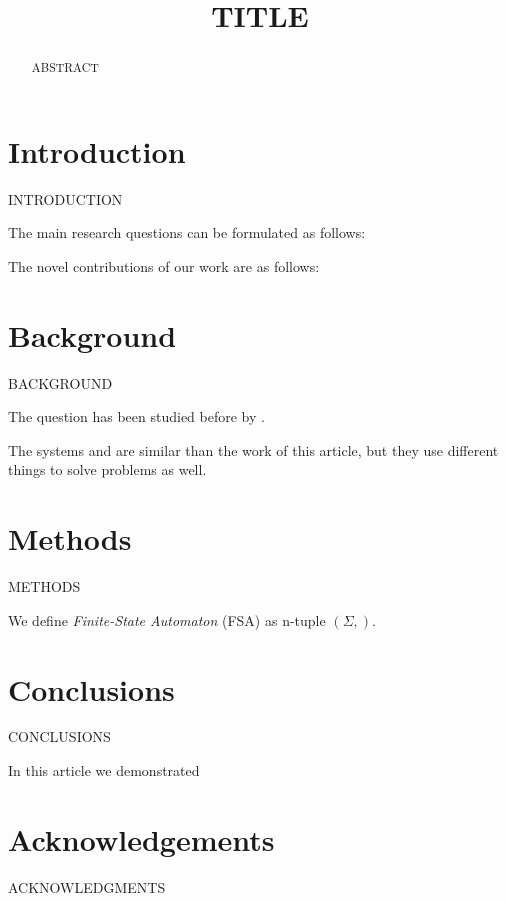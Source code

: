 \documentclass[a4paper,draft]{article}
\newif\ifcameraready
\begin{document}
\title{TITLE }


\ifcameraready
\author{AUTHOR \\
    \url{EMAIL} \\
    AFFILIATION \\
}
\fi

\maketitle
\begin{abstract}

    ABSTRACT
\end{abstract}

\section{Introduction}\label{sec:introduction}

INTRODUCTION

The main research questions can be formulated as follows:

The novel contributions of our work are as follows:



\section{Background}\label{sec:background}

BACKGROUND

The question has been studied before by \cite{}.

The systems \cite{} and \cite{} are similar than the work of this article, but
they use different things to solve problems as well.

\section{Methods}\label{sec:methods}

METHODS

We define \textit{Finite-State Automaton} (FSA) as n-tuple $(\Sigma, )$.

\section{Conclusions}\label{sec:conclusions}

CONCLUSIONS

In this article we demonstrated

\section*{Acknowledgements}

ACKNOWLEDGMENTS



\end{document}
